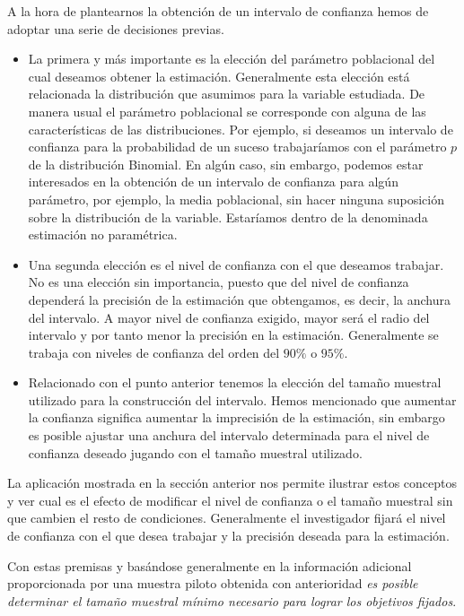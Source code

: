 \documentclass[
]{article}
\begin{document}
A la hora de plantearnos la obtención de un intervalo de confianza hemos de adoptar una serie de decisiones previas.

\begin{itemize}
\item
  La primera y más importante es la elección del parámetro poblacional del cual deseamos obtener la estimación. Generalmente esta elección está relacionada la distribución que asumimos para la variable estudiada. De manera usual el parámetro poblacional se corresponde con alguna de las características de las distribuciones. Por ejemplo, si deseamos un intervalo de confianza para la probabilidad de un suceso trabajaríamos con el parámetro \(p\) de la distribución Binomial. En algún caso, sin embargo, podemos estar interesados en la obtención de un intervalo de confianza para algún parámetro, por ejemplo, la media poblacional, sin hacer ninguna suposición sobre la distribución de la variable. Estaríamos dentro de la denominada estimación no paramétrica.
\item
  Una segunda elección es el nivel de confianza con el que deseamos trabajar. No es una elección sin importancia, puesto que del nivel de confianza dependerá la precisión de la estimación que obtengamos, es decir, la anchura del intervalo. A mayor nivel de confianza exigido, mayor será el radio del intervalo y por tanto menor la precisión en la estimación. Generalmente se trabaja con niveles de confianza del orden del \(90 \%\) o \(95 \%\).
\item
  Relacionado con el punto anterior tenemos la elección del tamaño muestral utilizado para la construcción del intervalo. Hemos mencionado que aumentar la confianza significa aumentar la imprecisión de la estimación, sin embargo es posible ajustar una anchura del intervalo determinada para el nivel de confianza deseado jugando con el tamaño muestral utilizado.
\end{itemize}

La aplicación mostrada en la sección anterior nos permite ilustrar estos conceptos y ver cual es el efecto de modificar el nivel de confianza o el tamaño muestral sin que cambien el resto de condiciones. Generalmente el investigador fijará el nivel de confianza con el que desea trabajar y la precisión deseada para la estimación.

Con estas premisas y basándose generalmente en la información adicional proporcionada por una muestra piloto obtenida con anterioridad \emph{es posible determinar el tamaño muestral mínimo necesario para lograr los objetivos fijados}.
\end{document}
